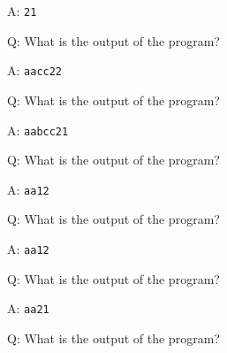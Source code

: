 \begin{frame}[fragile]{A: \texttt{21}}
\end{frame}

\begin{frame}[fragile]{Q: What is the output of the program?}
\end{frame}

\begin{frame}[fragile]{A: \texttt{aacc22}}
\end{frame}

\begin{frame}[fragile]{Q: What is the output of the program?}
\end{frame}

\begin{frame}[fragile]{A: \texttt{aabcc21}}
\end{frame}

\begin{frame}[fragile]{Q: What is the output of the program?}
\end{frame}

\begin{frame}[fragile]{A: \texttt{aa12}}
\end{frame}

\begin{frame}[fragile]{Q: What is the output of the program?}
\end{frame}

\begin{frame}[fragile]{A: \texttt{aa12}}
\end{frame}

\begin{frame}[fragile]{Q: What is the output of the program?}
\end{frame}

\begin{frame}[fragile]{A: \texttt{aa21}}
\end{frame}

\begin{frame}[fragile]{Q: What is the output of the program?}
\end{frame}

